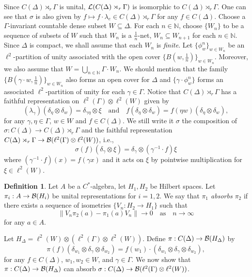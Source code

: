 \documentclass[11pt]{article}
\theoremstyle{definition}
\newtheorem{Def}{Definition}[section]
\theoremstyle{plain}
\def\IN{\mathbb N}\def\IR{\mathbb R}\def\IE{\mathbb E}\def\IC{\mathbb C}\def\IL{\mathbb L}\def\IQ{\mathbb Q}\def\IA{\mathbb A}\def\IZ{\mathbb Z}
\def\ox{\otimes}
\def\ox{\otimes}
\def\Ga{\Gamma}
\begin{document}
 
Since $C(\Delta)\rtimes_r\Ga$ is unital, $\L(C(\Delta)\rtimes_r\Ga)$ is isomorphic to $C(\Delta)\rtimes_r\Ga$. One can see that $\sigma$ is also given by $f\mapsto f\cdot\lambda_e\in C(\Delta)\rtimes_r\Ga$ for any $f\in C(\Delta)$. Choose a $\Ga$-invariant countable dense subset $W\subseteq \Delta$. For each $n\in\IN$, choose $\{W_n\}$ to be a sequence of subsets of $W$ such that $W_n$ is a $\frac 1n$-net, $W_n\subseteq W_{n+1}$ for each $n\in\IN$. Since $\Delta$ is compact, we shall assume that each $W_n$ is \emph{finite}. Let $\{\phi_w^n\}_{w\in W_n}$ be an $\ell^2$-partition of unity associated with the open cover $\{B(w,\frac 1n)\}_{w\in W_n}$. Moreover, we also assume that $W=\bigcup_{n\in\IN}\Ga\cdot W_n$. We should mention that the family $\{B(\gamma\cdot w,\frac 1n)\}_{w\in W_n}$ also forms an open cover for $\Delta$ and $\{\gamma\cdot\phi_w^n\}$ forms an associated $\ell^2$-partition of unity for each $\gamma\in\Ga$. Notice that $C(\Delta)\rtimes_r\Ga$ has a faithful representation on $\ell^2(\Ga)\ox\ell^2(W)$ given by
$$(\lambda_{\gamma})(\delta_{\eta}\ox\delta_w)=\delta_{\gamma\eta}\ox\xi\quad\text{and}\quad f(\delta_\eta\ox\delta_w)=f(\eta w)(\delta_\eta\ox \delta_w),$$
for any $\gamma,\eta\in\Ga$, $w\in W$ and $f\in C(\Delta)$.
We still write it $\sigma$ the composition of $\sigma:C(\Delta)\to C(\Delta)\rtimes_r\Ga$ and the faithful representation $C(\Delta)\rtimes_r\Ga\to\B(\ell^2(\Ga)\ox\ell^2(W))$, i.e.,
$$\sigma(f)(\delta_\gamma\ox\xi)=\delta_\gamma\ox(\gamma^{-1}\cdot f)\xi$$
where $(\gamma^{-1}\cdot f)(x)=f(\gamma x)$ and it acts on $\xi$ by pointwise multiplication for $\xi\in\ell^2(W)$.

\begin{Def}\label{absorbing representation}
Let $A$ be a $C^*$-algebra, let $H_1,H_2$ be Hilbert spaces. Let $\pi_i: A\to\mathcal B(H_i)$ be unital representations for $i=1,2$. We say that \emph{$\pi_1$ absorbs $\pi_2$} if there exists a sequence of isometries $\{V_n:H_2\to H_1\}$ such that
$$\|V_n\pi_2(a)-\pi_1(a)V_n\|\to 0\quad \text{as}\quad n\to\infty$$
for any $a\in A$.
\end{Def}

Let $H_{\Delta}=\ell^2(W)\ox(\ell^2(\Ga)\ox\ell^2(W))$. Define $\pi:C(\Delta)\to \mathcal B(H_{\Delta})$ by
$$\pi(f)(\delta_{w_1}\ox \delta_\gamma\ox\delta_{w_2})=f(w_1)\cdot(\delta_{w_1}\ox \delta_\gamma\ox\delta_{w_2}),$$
for any $f\in C(\Delta)$, $w_1,w_2\in W$, and $\gamma\in \Ga$. We now show that $\pi:C(\Delta)\to \mathcal B(H_{\Delta})$ can absorb $\sigma:C(\Delta)\to\B(\ell^2(\Ga)\ox\ell^2(W))$.
\end{document}
